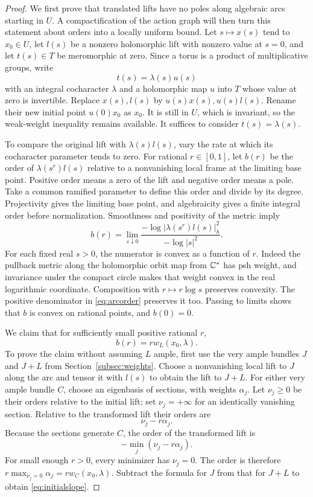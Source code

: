 \begin{proof}
We first prove that translated lifts have no poles along algebraic arcs starting in $U$. A compactification of the action graph will then turn this statement about orders into a locally uniform bound. Let $s\mapsto x(s)$ tend to $x_0\in U$, let $l(s)$ be a nonzero holomorphic lift with nonzero value at $s=0$, and let $t(s)\in T$ be meromorphic at zero. Since a torus is a product of multiplicative groups, write
\[
t(s)=\lambda(s)u(s)
\]
with an integral cocharacter $\lambda$ and a holomorphic map $u$ into $T$ whose value at zero is invertible. Replace $x(s),l(s)$ by $u(s)x(s),u(s)l(s)$. Rename their new initial point $u(0)x_0$ as $x_0$. It is still in $U$, which is invariant, so the weak-weight inequality remains available. It suffices to consider $t(s)=\lambda(s)$.

To compare the original lift with $\lambda(s)l(s)$, vary the rate at which its cocharacter parameter tends to zero. For rational $r\in[0,1]$, let $b(r)$ be the order of $\lambda(s^r)l(s)$ relative to a nonvanishing local frame at the limiting base point. Positive order means a zero of the lift and negative order means a pole. Take a common ramified parameter to define this order and divide by its degree. Projectivity gives the limiting base point, and algebraicity gives a finite integral order before normalization. Smoothness and positivity of the metric imply
\begin{equation}\label{eq:arcorder}
b(r)=\lim_{s\downarrow0}
\frac{-\log|\lambda(s^r)l(s)|_h^2}{-\log|s|^2}.
\end{equation}
For each fixed real $s>0$, the numerator is convex as a function of $r$. Indeed the pullback metric along the holomorphic orbit map from $\mathbb C^*$ has psh weight, and invariance under the compact circle makes that weight convex in the real logarithmic coordinate. Composition with $r\mapsto r\log s$ preserves convexity. The positive denominator in \eqref{eq:arcorder} preserves it too. Passing to limits shows that $b$ is convex on rational points, and $b(0)=0$.

We claim that for sufficiently small positive rational $r$,
\begin{equation}\label{eq:initialslope}
b(r)=r w_L(x_0,\lambda).
\end{equation}
To prove the claim without assuming $L$ ample, first use the very ample bundles $J$ and $J+L$ from Section~\ref{subsec:weights}. Choose a nonvanishing local lift to $J$ along the arc and tensor it with $l(s)$ to obtain the lift to $J+L$. For either very ample bundle $C$, choose an eigenbasis of sections, with weights $\alpha_j$. Let $\nu_j\ge0$ be their orders relative to the initial lift; set $\nu_j=+\infty$ for an identically vanishing section. Relative to the transformed lift their orders are
\[
\nu_j-r\alpha_j.
\]
Because the sections generate $C$, the order of the transformed lift is
\[
-\min_j(\nu_j-r\alpha_j).
\]
For small enough $r>0$, every minimizer has $\nu_j=0$. The order is therefore $r\max_{\nu_j=0}\alpha_j=r w_C(x_0,\lambda)$. Subtract the formula for $J$ from that for $J+L$ to obtain \eqref{eq:initialslope}.


\end{proof}
